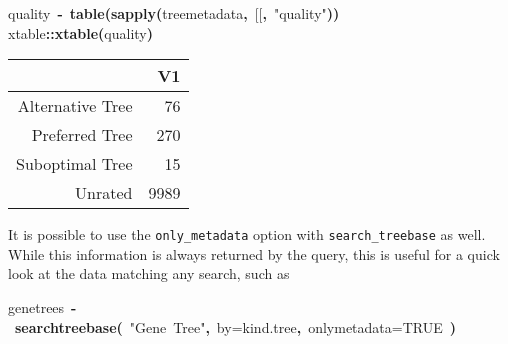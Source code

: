 \documentclass[authoryear, preprint]{elsarticle}
\makeatletter
\newcommand{\hlnumber}[1]{\textcolor[rgb]{0,0,0}{#1}}%
\newcommand{\hlfunctioncall}[1]{\textcolor[rgb]{.5,0,.33}{\textbf{#1}}}%
\newcommand{\hlstring}[1]{\textcolor[rgb]{.6,.6,1}{#1}}%
\newcommand{\hlkeyword}[1]{\textbf{#1}}%
\newcommand{\hlargument}[1]{\textcolor[rgb]{.69,.25,.02}{#1}}%
\newcommand{\hlassignement}[1]{\textbf{#1}}%
\newcommand{\hlpackage}[1]{\textcolor[rgb]{.59,.71,.145}{#1}}%
\newcommand{\hlsymbol}[1]{#1}%
\newcommand{\hlstd}[1]{\textcolor[rgb]{0,0,0}{#1}}%
\newenvironment{kframe}{%
 \def\FrameCommand##1{\hskip\@totalleftmargin \hskip-\fboxsep
 \colorbox{shadecolor}{##1}\hskip-\fboxsep
     \hskip-\linewidth \hskip-\@totalleftmargin \hskip\columnwidth}%
 \MakeFramed {\advance\hsize-\width
   \@totalleftmargin\z@ \linewidth\hsize
   \@setminipage}}%
 {\par\unskip\endMakeFramed}
\newenvironment{knitrout}{}{} %
\makeatother
\begin{document}
\begin{knitrout}
\color{fgcolor}\begin{kframe}
\begin{flushleft}
\ttfamily\noindent
\hlsymbol{quality}{\ }\hlassignement{\usebox{\hlnormalsizeboxlessthan}-}{\ }\hlfunctioncall{table}\hlkeyword{(}\hlfunctioncall{sapply}\hlkeyword{(}\hlsymbol{tree\usebox{\hlnormalsizeboxunderscore}metadata}\hlkeyword{,}{\ }\hlsymbol{\usebox{\hlnormalsizeboxbacktick}[[\usebox{\hlnormalsizeboxbacktick}}\hlkeyword{,}{\ }\hlstring{"{}quality"{}}\hlkeyword{)}\hlkeyword{)}\hspace*{\fill}\\
\hlstd{}\hlpackage{xtable}\hlkeyword{::}\hlfunctioncall{xtable}\hlkeyword{(}\hlsymbol{quality}\hlkeyword{)}\mbox{}
\normalfont
\end{flushleft}
\end{kframe}\begin{table}[ht]
\begin{center}
\begin{tabular}{rr}
  \hline
 & V1 \\ 
  \hline
Alternative Tree &  76 \\ 
  Preferred Tree & 270 \\ 
  Suboptimal Tree &  15 \\ 
  Unrated & 9989 \\ 
   \hline
\end{tabular}
\end{center}
\end{table}\color{fgcolor}
\end{knitrout}


It is possible to use the \verb|only_metadata| option with \verb|search_treebase| as well.  While this information is always returned by the query, this is useful for a quick look at the data matching any search, such as
\begin{knitrout}
\color{fgcolor}\begin{kframe}
\begin{flushleft}
\ttfamily\noindent
\hlsymbol{genetrees}{\ }\hlassignement{\usebox{\hlnormalsizeboxlessthan}-}{\ }\hlfunctioncall{search\usebox{\hlnormalsizeboxunderscore}treebase}\hlkeyword{(}{\ }\hlstring{"{}\usebox{\hlnormalsizeboxsinglequote}Gene{\ }Tree\usebox{\hlnormalsizeboxsinglequote}"{}}\hlkeyword{,}{\ }\hlargument{by}\hlargument{=}\hlstring{\usebox{\hlnormalsizeboxsinglequote}kind.tree\usebox{\hlnormalsizeboxsinglequote}}\hlkeyword{,}{\ }\hlargument{only\usebox{\hlnormalsizeboxunderscore}metadata}\hlargument{=}\hlnumber{TRUE}{\ }\hlkeyword{)}\mbox{}
\normalfont
\end{flushleft}
\end{kframe}
\end{knitrout}
\end{document}
